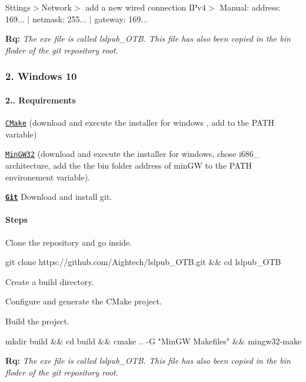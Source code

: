 Sttings$>$Network$>$ add a new wired connection I\+Pv4$>$ Manual\+: address\+: 169... $\vert$ netmask\+: 255... $\vert$ gateway\+: 169...

{\bfseries Rq\+:} {\itshape The exe file is called lslpub\+\_\+\+O\+TB. This file has also been copied in the bin floder of the git repository root.}

\subsubsection*{2. Windows 10}

\paragraph*{2.. {\bfseries Requirements}}


\begin{DoxyItemize}
\item \href{https://cmake.org/download/}{\tt C\+Make} (download and execute the installer for windows , add to the P\+A\+TH variable)
\item \href{https://sourceforge.net/projects/mingw-w64/}{\tt Min\+G\+W32} (download and execute the installer for windows, chose i686\+\_ architecture, add the the bin folder address of min\+GW to the P\+A\+TH environement variable).
\item \href{https://git-for-windows.github.io/}{\tt {\bfseries Git}} Download and install git. \paragraph*{Steps}
\end{DoxyItemize}


\begin{DoxyItemize}
\item Clone the repository and go inside. 
\begin{DoxyCode}
git clone https://github.com/Aightech/lslpub\_OTB.git && cd lslpub\_OTB
\end{DoxyCode}

\item Create a build directory.
\item Configure and generate the C\+Make project.
\item Build the project. 
\begin{DoxyCode}
mkdir build && cd build && cmake .. -G "MinGW Makefiles" && mingw32-make
\end{DoxyCode}
 {\bfseries Rq\+:} {\itshape The exe file is called lslpub\+\_\+\+O\+TB. This file has also been copied in the bin floder of the git repository root.}
\end{DoxyItemize}

